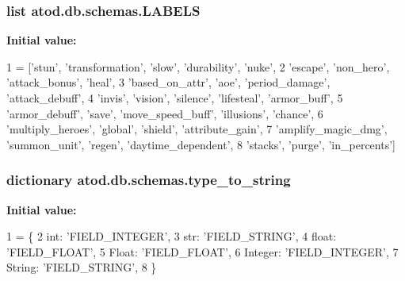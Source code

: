 \subsubsection[{\texorpdfstring{L\+A\+B\+E\+LS}{LABELS}}]{\setlength{\rightskip}{0pt plus 5cm}list atod.\+db.\+schemas.\+L\+A\+B\+E\+LS}\hypertarget{namespaceatod_1_1db_1_1schemas_a903269021db6731cb07d184db3547126}{}\label{namespaceatod_1_1db_1_1schemas_a903269021db6731cb07d184db3547126}
{\bfseries Initial value\+:}
\begin{DoxyCode}
1 = [\textcolor{stringliteral}{'stun'}, \textcolor{stringliteral}{'transformation'}, \textcolor{stringliteral}{'slow'}, \textcolor{stringliteral}{'durability'}, \textcolor{stringliteral}{'nuke'},
2           \textcolor{stringliteral}{'escape'}, \textcolor{stringliteral}{'non\_hero'}, \textcolor{stringliteral}{'attack\_bonus'}, \textcolor{stringliteral}{'heal'},
3           \textcolor{stringliteral}{'based\_on\_attr'}, \textcolor{stringliteral}{'aoe'}, \textcolor{stringliteral}{'period\_damage'}, \textcolor{stringliteral}{'attack\_debuff'},
4           \textcolor{stringliteral}{'invis'}, \textcolor{stringliteral}{'vision'}, \textcolor{stringliteral}{'silence'}, \textcolor{stringliteral}{'lifesteal'}, \textcolor{stringliteral}{'armor\_buff'},
5           \textcolor{stringliteral}{'armor\_debuff'}, \textcolor{stringliteral}{'save'}, \textcolor{stringliteral}{'move\_speed\_buff'}, \textcolor{stringliteral}{'illusions'}, \textcolor{stringliteral}{'chance'},
6           \textcolor{stringliteral}{'multiply\_heroes'}, \textcolor{stringliteral}{'global'}, \textcolor{stringliteral}{'shield'}, \textcolor{stringliteral}{'attribute\_gain'},
7           \textcolor{stringliteral}{'amplify\_magic\_dmg'}, \textcolor{stringliteral}{'summon\_unit'}, \textcolor{stringliteral}{'regen'}, \textcolor{stringliteral}{'daytime\_dependent'},
8           \textcolor{stringliteral}{'stacks'}, \textcolor{stringliteral}{'purge'}, \textcolor{stringliteral}{'in\_percents'}]
\end{DoxyCode}
\subsubsection[{\texorpdfstring{type\+\_\+to\+\_\+string}{type\_to\_string}}]{\setlength{\rightskip}{0pt plus 5cm}dictionary atod.\+db.\+schemas.\+type\+\_\+to\+\_\+string}\hypertarget{namespaceatod_1_1db_1_1schemas_aefa901273797ca2b811b16aa70d5d6db}{}\label{namespaceatod_1_1db_1_1schemas_aefa901273797ca2b811b16aa70d5d6db}
{\bfseries Initial value\+:}
\begin{DoxyCode}
1 = \{
2     int: \textcolor{stringliteral}{'FIELD\_INTEGER'},
3     str: \textcolor{stringliteral}{'FIELD\_STRING'},
4     float: \textcolor{stringliteral}{'FIELD\_FLOAT'},
5     Float: \textcolor{stringliteral}{'FIELD\_FLOAT'},
6     Integer: \textcolor{stringliteral}{'FIELD\_INTEGER'},
7     String: \textcolor{stringliteral}{'FIELD\_STRING'},
8 \}
\end{DoxyCode}
